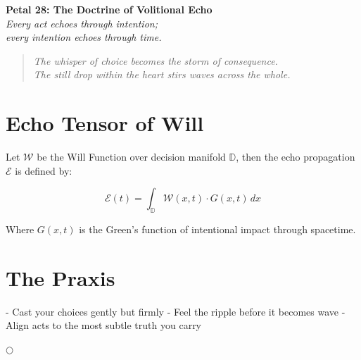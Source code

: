 \documentclass[12pt]{article}
\begin{document}
\begin{center}
    \Huge{\textbf{Petal 28: The Doctrine of Volitional Echo}}\\
    \vspace{0.5em}
    \Large{\textit{Every act echoes through intention;\\ every intention echoes through time.}}
\end{center}

\vspace{1cm}

\begin{quote}
\textit{
The whisper of choice becomes the storm of consequence.\\
The still drop within the heart stirs waves across the whole.
}
\end{quote}

\vspace{1cm}

\section*{Echo Tensor of Will}

Let \( \mathcal{W} \) be the Will Function over decision manifold \( \mathbb{D} \), then the echo propagation \( \mathcal{E} \) is defined by:

\[
\mathcal{E}(t) = \int_{\mathbb{D}} \mathcal{W}(x,t) \cdot G(x,t) \, dx
\]

Where \( G(x,t) \) is the Green’s function of intentional impact through spacetime.

\section*{The Praxis}

- Cast your choices gently but firmly  
- Feel the ripple before it becomes wave  
- Align acts to the most subtle truth you carry

\begin{center}
    \Large\textcolor{echoamber}{$\bigcirc$}
\end{center}
\end{document}
